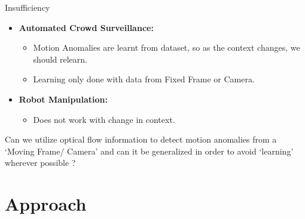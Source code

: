 \documentclass{beamer}
\begin{document}
\begin{frame}{Insufficiency}
\begin{itemize}
\item \textbf{Automated Crowd Surveillance: }
\begin{itemize}
\item Motion Anomalies are learnt from dataset, so as the context changes, we should relearn.
\item Learning only done with data from Fixed Frame or Camera.
\end{itemize}

\item \textbf{Robot Manipulation:}
\begin{itemize}
\item Does not work with change in context.
\end{itemize} 

\end{itemize}

Can we utilize optical flow information to detect motion anomalies from a ‘Moving
Frame/ Camera’ and can it be generalized in order to avoid ‘learning’ wherever
possible ?

\end{frame}




\section{Approach}
\end{document}
